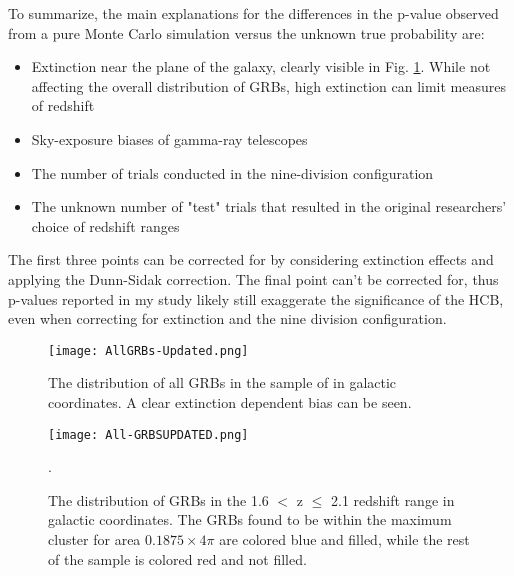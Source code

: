 \documentclass[fleqn,usenatbib]{mnras}
\begin{document}
To summarize, the main explanations for the differences in the p-value observed from a pure Monte Carlo simulation versus the unknown true probability are:
\begin{itemize}
    \item Extinction near the plane of the galaxy, clearly visible in Fig. \ref{fig:AllSkyGRBs}. While not affecting the overall distribution of GRBs, high extinction can limit measures of redshift
    \item Sky-exposure biases of gamma-ray telescopes
    \item The number of trials conducted in the nine-division configuration
    \item The unknown number of "test" trials that resulted in the original researchers' choice of redshift ranges
\end{itemize}

The first three points can be corrected for by considering extinction effects and applying the Dunn-Sidak correction. The final point can't be corrected for, thus p-values reported in my study likely still exaggerate the significance of the HCB, even when correcting for extinction and the nine division configuration.

\begin{figure}
    \centering
    \texttt{[image: AllGRBs-Updated.png]}
    \caption{The distribution of all GRBs in the sample of \citet{horvath2015} in galactic coordinates. A clear extinction dependent bias can be seen.}
    \label{fig:AllSkyGRBs}
\end{figure}
\begin{figure}
	\texttt{[image: All-GRBSUPDATED.png]}
    \caption{The distribution of GRBs in the 1.6 $<$ z $\leq$ 2.1 redshift range in galactic coordinates. The GRBs found to be within the maximum cluster for area \(0.1875 ×4\pi\) are colored blue and filled, while the rest of the sample is colored red and not filled.}
    \label{fig:GRBredshift}.
\end{figure}
\end{document}
